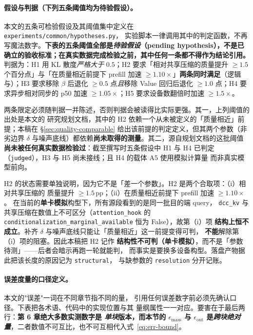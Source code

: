 \paragraph{假设与判据（下列五条阈值均为待验假设）。}本文的五条可检验假设及其阈值集中定义在
\texttt{experiments/}\allowbreak\texttt{common/}\allowbreak\texttt{hypotheses.py}，
实验脚本一律调用其中的判定函数，不再写魔法数字。\textbf{下表的五条阈值全部是\emph{待验假设}（pending hypothesis），不是已确立的验收标准；在真实数据完成检验之前，其中任何一条都不得作为结论引用。}判据为：H1 用 KL 散度\emph{严格大于}
$0.5$；H2 要求「相对共享压缩的质量提升 $\ge 1.5$ 个百分点」与「在质量相近前提下 prefill
加速 $\ge 1.10\times$」\textbf{两条同时满足}（逻辑与）；H3 要求移除 $\beta$ 后退化
$\ge 0.5$ 点\emph{且}移除 Value 回归后退化 $\ge 1.0$ 点；H4 要求异步相对同步的 p50 加速
$\ge 1.05\times$；H5 要求设备数翻倍时加速 $\ge 1.5\times$。

两条限定必须随判据一并陈述，否则判据会被读得比实际更强。其一，上列阈值的出处是本文的
研究规划文档，其中的 H2 依赖一个从未被定义的「质量相近」前提；本稿在
\S\ref{sec:quality-comparable} 给出该前提的判定定义，但其两个参数（非劣边界 $\delta$
与噪声底线）都依赖\textbf{尚未取得的测量}。其二，源自规划文档的这批阈值
\textbf{尚未被任何真实数据检验过}：截至撰写时五条假设中
H1 与 H4 已判定（\texttt{judged}），H3 与 H5 尚未接线；且 H4 的载体 A5 使用模拟计算量
而非真实模型前向。

H2 的状态需要单独说明，因为它不是「差一个参数」。H2 是两个合取项：（i）相对共享压缩的
质量提升 $\ge 1.5$\,pp；（ii）在质量相近前提下 prefill 加速 $\ge 1.10\times$。
在当前的\textbf{单卡模拟}构型下，所有源段看到的是同一批目的端 query，
\texttt{dcc\_kv} 与共享压缩在数值上不可区分（\texttt{attention\_hook} 的
\texttt{conditionalization\_marginal\_available} 恒为 False），故第（i）项
\textbf{结构上恒不成立}。补齐 $\delta$ 与噪声底线只能让「质量相近」这一前提变得可判，
\textbf{不能}解除第（i）项的阻塞。因此本稿把 H2 记作
\textbf{结构性不可判（单卡模拟）}，而不是「参数待测」——后者会暗示再跑一轮就能判，
而事实是要换多设备构型。落盘产物据此把该长度的原因记为 \texttt{structural}，
与缺参数的 \texttt{resolution} 分开记账。

\paragraph{误差度量的口径定义。}本文的"误差"一词在不同章节指不同的量，
引用任何误差数字前必须先确认口径。下表把各术语、代码中的实现位置与其
量纲属性一一对应。要害在于最后两行：\textbf{第 6 章绝大多数实测数字是
\emph{单块}版本，而本节的 $\epsilon_{\text{mass}}$ 与 $\epsilon_{\text{out}}$
是\emph{跨块绝对量}}，二者数值不可互比，也不可互相代入式~\eqref{eq:err-bound}。

